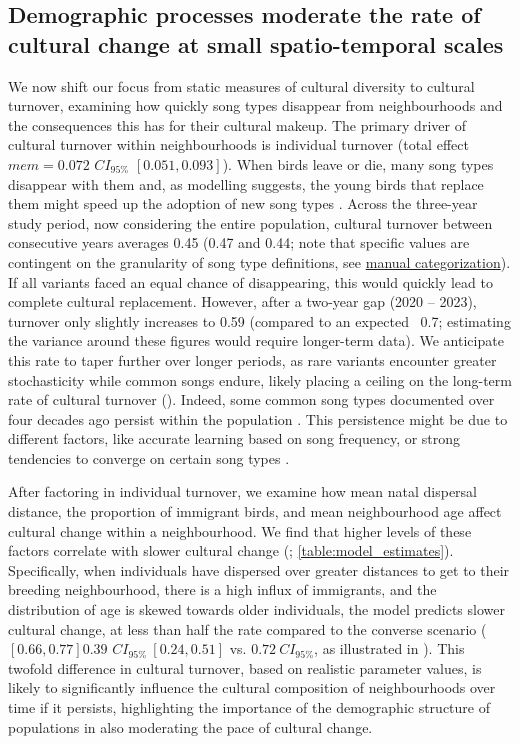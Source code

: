 \documentclass[9pt, onecolumn, twoside, lineno]{gsajnl}
\begin{document}
\subsection{Demographic processes moderate the rate of cultural change at small spatio-temporal scales}

We now shift our focus from static measures of cultural diversity to cultural turnover, examining how quickly song types disappear from neighbourhoods and the consequences this has for their cultural makeup. The primary driver of cultural turnover within neighbourhoods is individual turnover (total effect $mem = 0.072$ $CI_{95\%}$ $[0.051, 0.093]$). When birds leave or die, many song types disappear with them and, as modelling suggests, the young birds that replace them might speed up the adoption of new song types \autocite{dyble2024}. Across the three-year study period, now considering the entire population, cultural turnover between consecutive years averages 0.45 (0.47 and 0.44; note that specific values are contingent on the granularity of song type definitions, see \hyperref[sc:manual-categorization]{manual categorization}). If all variants faced an equal chance of disappearing, this would quickly lead to complete cultural replacement. However, after a two-year gap (2020 -- 2023), turnover only slightly increases to 0.59 (compared to an expected ~0.7; estimating the variance around these figures would require longer-term data). We anticipate this rate to taper further over longer periods, as rare variants encounter greater stochasticity while common songs endure, likely placing a ceiling on the long-term rate of cultural turnover (). Indeed, some common song types documented over four decades ago persist within the population \autocite{mcgregor1982b, keen2020}. This persistence might be due to different factors, like accurate learning based on song frequency, or strong tendencies to converge on certain song types \autocite{lachlan2018, tchernichovski2021, james2017, claidiere2007}.

After factoring in individual turnover, we examine how mean natal dispersal distance, the proportion of immigrant birds, and mean neighbourhood age affect cultural change within a neighbourhood. We find that higher levels of these factors correlate with slower cultural change  (; \autoref{table:model_estimates}). Specifically, when individuals have dispersed over greater distances to get to their breeding neighbourhood, there is a high influx of immigrants, and the distribution of age is skewed towards older individuals, the model predicts slower cultural change, at less than half the rate compared to the converse scenario ($[0.66, 0.77]$$0.39$ $CI_{95\%}~[0.24, 0.51]$ vs. $0.72~CI_{95\%}$, as illustrated in ). This twofold difference in cultural turnover, based on realistic parameter values, is likely to significantly influence the cultural composition of neighbourhoods over time if it persists, highlighting the importance of the demographic structure of populations in also moderating the pace of cultural change.
\end{document}
